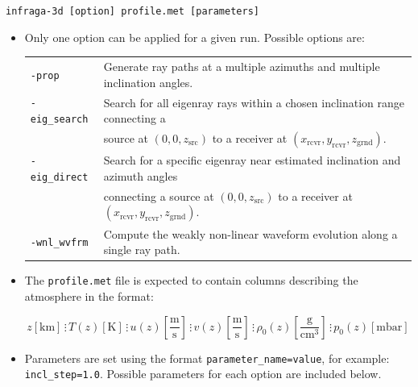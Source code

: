 \documentclass[10pt]{article}
\begin{document}
\begin{center} \begin{large}
\verb=infraga-3d [option] profile.met [parameters] =
\end{large} \end{center}

\begin{itemize}
 \item Only one option can be applied for a given run.  Possible options are:

\begin{tabular}{  l l }
  \verb=-prop=		& Generate ray paths at a multiple azimuths and multiple inclination angles. \\
  \verb=-eig_search=	& Search for all eigenray rays within a chosen inclination range connecting a \\
  				& \hspace{2pt} source at \( \left( 0, 0, z_\text{src} \right)\) to a receiver at \( \left( x_\text{rcvr}, y_\text{rcvr}, z_\text{grnd} \right) \). \\
  \verb=-eig_direct=	& Search for a specific eigenray near estimated inclination and azimuth angles \\
    				& \hspace{2pt} connecting a source at \( \left( 0, 0, z_\text{src} \right)\) to a receiver at \( \left( x_\text{rcvr}, y_\text{rcvr}, z_\text{grnd} \right) \). \\
  \verb=-wnl_wvfrm=	& Compute the weakly non-linear waveform evolution along a single ray path.

 \end{tabular}
 
 \item The \verb=profile.met= file is expected to contain columns describing the atmosphere in the format:

\begin{equation*} 
 z \left[ \text{km} \right] \hspace{2pt} \vdots \hspace{2pt}
 T(z) \left[ \text{K} \right] \hspace{2pt} \vdots \hspace{2pt}
 u(z) \left[ \frac{\text{m}}{\text{s}} \right] \hspace{2pt} \vdots \hspace{2pt}
 v(z) \left[ \frac{\text{m}}{\text{s}} \right] \hspace{2pt} \vdots \hspace{2pt}
 \rho_0(z) \left[ \frac{\text{g}}{\text{cm}^3} \right] \hspace{2pt} \vdots \hspace{2pt}
 p_0(z) \left[ \text{mbar} \right] 
\end{equation*}

 \item Parameters are set using the format \verb#parameter_name=value#, for example: \verb#incl_step=1.0#.  Possible parameters for each option are included below.
 \end{itemize}
\end{document}
